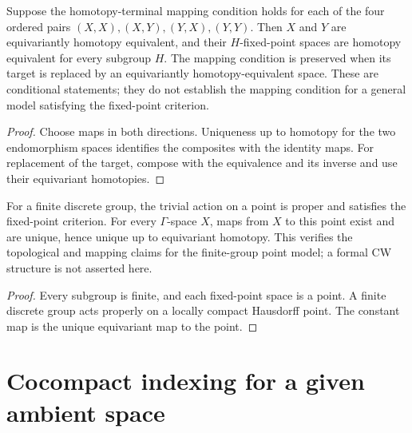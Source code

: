\begin{proposition}\label{prop:conditional-universal-model-uniqueness}
Suppose the homotopy-terminal mapping condition holds for each of the
four ordered pairs $(X,X),(X,Y),(Y,X),(Y,Y)$. Then $X$ and $Y$ are
equivariantly homotopy equivalent, and their $H$-fixed-point spaces are
homotopy equivalent for every subgroup $H$. The mapping condition is
preserved when its target is replaced by an equivariantly homotopy-equivalent space.
These are conditional statements; they do not establish the mapping
condition for a general model satisfying the fixed-point criterion.
\end{proposition}
\begin{proof}
\leanok
Choose maps in both directions. Uniqueness up to homotopy for the two
endomorphism spaces identifies the composites with the identity maps.
For replacement of the target, compose with the equivalence and its
inverse and use their equivariant homotopies.
\end{proof}

\begin{proposition}\label{prop:finite-group-point-model}
For a finite discrete group, the trivial action on a point is proper and
satisfies the fixed-point criterion. For every $\Gamma$-space $X$, maps
from $X$ to this point exist and are unique, hence unique up to
equivariant homotopy. This verifies the topological and mapping claims
for the finite-group point model; a formal CW structure is not asserted here.
\end{proposition}
\begin{proof}
\leanok
Every subgroup is finite, and each fixed-point space is a point. A
finite discrete group acts properly on a locally compact Hausdorff point.
The constant map is the unique equivariant map to the point.
\end{proof}

\section{Cocompact indexing for a given ambient space}

